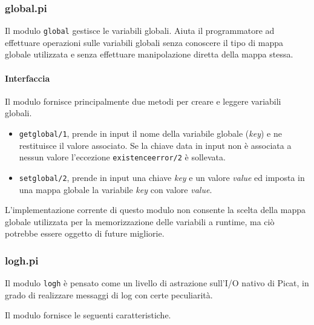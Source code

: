 \documentclass[12pt,a4paper,openright]{book} %
\begin{document}
\subsubsection{global.pi}

Il modulo \texttt{global} gestisce le variabili globali. Aiuta il programmatore ad effettuare operazioni sulle variabili globali senza conoscere il tipo di mappa globale utilizzata e senza effettuare manipolazione diretta della mappa stessa.

\paragraph{Interfaccia}
Il modulo fornisce principalmente due metodi per creare e leggere variabili globali.

\begin{itemize}
	\item \texttt{get\textunderscore global/1}, prende in input il nome della variabile globale (\emph{key}) e ne restituisce il valore associato. Se la chiave data in input non è associata a nessun valore l'eccezione \texttt{existence\textunderscore error/2} è sollevata.
	\item \texttt{set\textunderscore global/2}, prende in input una chiave \emph{key} e un valore \emph{value} ed imposta in una mappa globale la variabile \emph{key} con valore \emph{value}.
\end{itemize}

L'implementazione corrente di questo modulo non consente la scelta della mappa globale utilizzata per la memorizzazione delle variabili a runtime, ma ciò potrebbe essere oggetto di future migliorie.

\subsubsection{log\textunderscore h.pi}

Il modulo \texttt{log\textunderscore h} è pensato come un livello di astrazione sull'I/O nativo di Picat, in grado di realizzare messaggi di log con certe peculiarità.

Il modulo fornisce le seguenti caratteristiche.
\end{document}
